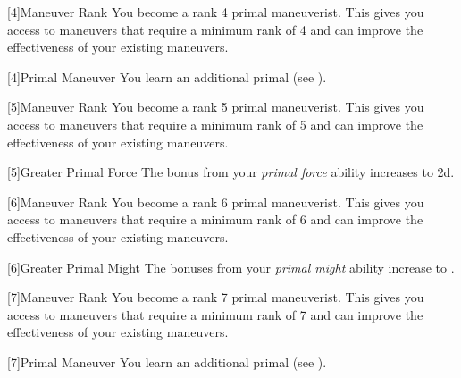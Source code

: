         {
            [4]{Maneuver Rank} You become a rank 4 primal maneuverist.
            This gives you access to maneuvers that require a minimum rank of 4 and can improve the effectiveness of your existing maneuvers.

            [4]{Primal Maneuver}
            You learn an additional primal  (see ).
        }

        {
            [5]{Maneuver Rank} You become a rank 5 primal maneuverist.
            This gives you access to maneuvers that require a minimum rank of 5 and can improve the effectiveness of your existing maneuvers.

            [5]{Greater Primal Force} The bonus from your \textit{primal force} ability increases to \plus2d.
        }

        {
            [6]{Maneuver Rank} You become a rank 6 primal maneuverist.
            This gives you access to maneuvers that require a minimum rank of 6 and can improve the effectiveness of your existing maneuvers.

            [6]{Greater Primal Might} The bonuses from your \textit{primal might} ability increase to .
        }

        {
            [7]{Maneuver Rank} You become a rank 7 primal maneuverist.
            This gives you access to maneuvers that require a minimum rank of 7 and can improve the effectiveness of your existing maneuvers.

            [7]{Primal Maneuver}
            You learn an additional primal  (see ).

        }


\newpage
